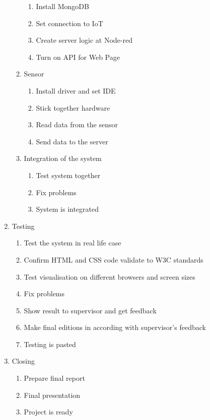 \documentclass[english]{article}
\begin{document}
\begin{enumerate}
\begin{enumerate}[label*=\arabic*]
\begin{enumerate}[label*=\arabic*]
		\item Install MongoDB
		\item Set connection to IoT
		\item Create server logic at Node-red
		\item Turn on API for Web Page
		\end{enumerate}
	\item Sensor
		\begin{enumerate}[label*=\arabic*]
		\item Install driver and set IDE
		\item Stick together hardware
		\item Read data from the sensor
		\item Send data to the server
		\end{enumerate}
	\item Integration of the system
		\begin{enumerate}[label*=\arabic*]
		\item Test system together
		\item Fix problems
		\item System is integrated
		\end{enumerate}
	\end{enumerate}
\item Testing
	\begin{enumerate}[label*=\arabic*]
	\item Test the system in real life case
	\item Confirm HTML and CSS code validate to W3C standards
	\item Test visualisation on different browsers and screen sizes
	\item Fix problems
	\item Show result to supervisor and get feedback
	\item Make final editions in according with supervisor's feedback
	\item Testing is pasted
	\end{enumerate}
\item Closing 
	\begin{enumerate}[label*=\arabic*]
	\item Prepare final report
	\item Final presentation
	\item Project is ready
	\end{enumerate}
\end{enumerate}
\end{document}
